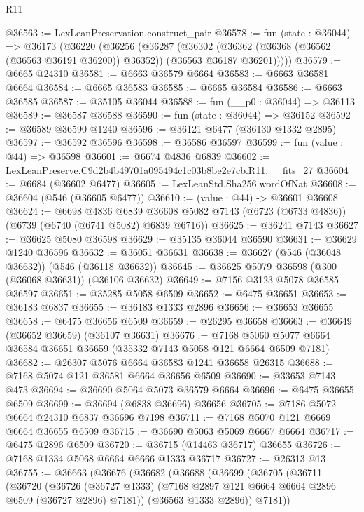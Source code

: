 \begin{lexlean}{R11}
\begin{coremodule}
@36563 := LexLeanPreservation.construct_pair
@36578 := fun (state : @36044) =>
  @36173
    (@36220
      (@36256
        (@36287
          (@36302
            (@36362 (@36368 (@36562 (@36563 @36191 @36200)) @36352))
            (@36563 @36187 @36201)))))
@36579 := @6665 @24310
@36581 := @6663 @36579 @6664
@36583 := @6663 @36581 @6664
@36584 := @6665 @36583
@36585 := @6665 @36584
@36586 := @6663 @36585
@36587 := @35105 @36044
@36588 := fun (__p0 : @36044) => @36113
@36589 := @36587 @36588
@36590 := fun (state : @36044) => @36152
@36592 := @36589 @36590 @1240
@36596 := @36121 @6477 (@36130 @1332 @2895)
@36597 := @36592 @36596
@36598 := @36586 @36597
@36599 := fun (value : @44) => @36598
@36601 := @6674 @4836 @6839
@36602 := LexLeanPreserve.C9d2b4b49701a095494c1c03b8be2e7cb.R11.__fits_27
@36604 := @6684 (@36602 @6477)
@36605 := LexLeanStd.Sha256.wordOfNat
@36608 := @36604 (@546 (@36605 @6477))
@36610 := (value : @44) -> @36601 @36608
@36624 := @6698
    @4836
    @6839
    @36608
    @5082
    @7143
    (@6723 (@6733 @4836))
    (@6739 (@6740 (@6741 @5082) @6839 @6716))
@36625 := @36241 @7143
@36627 := @36625 @5080 @36598
@36629 := @35135 @36044 @36590
@36631 := @36629 @1240 @36596
@36632 := @36051 @36631
@36638 := @36627 (@546 (@36048 @36632)) (@546 (@36118 @36632))
@36645 := @36625 @5079 @36598 (@300 (@36068 @36631)) (@36106 @36632)
@36649 := @7156 @3123 @5078 @36585 @36597
@36651 := @35285 @5058 @6509
@36652 := @6475 @36651
@36653 := @36183 @6837
@36655 := @36183 @1333 @2896
@36656 := @36653 @36655
@36658 := @6475 @36656 @6509
@36659 := @26295 @36658
@36663 := @36649 (@36652 @36659) (@36107 @36631)
@36676 := @7168 @5060 @5077 @6664 @36584 @36651 @36659 (@35332 @7143 @5058 @121 @6664 @6509 @7181)
@36682 := @26307 @5076 @6664 @36583 @1241 @36658 @26315
@36688 := @7168 @5074 @121 @36581 @6664 @36656 @6509
@36690 := @33653 @7143 @473
@36694 := @36690 @5064 @5073 @36579 @6664
@36696 := @6475 @36655 @6509
@36699 := @36694 (@6838 @36696) @36656
@36705 := @7186 @5072 @6664 @24310 @6837 @36696 @7198
@36711 := @7168 @5070 @121 @6669 @6664 @36655 @6509
@36715 := @36690 @5063 @5069 @6667 @6664
@36717 := @6475 @2896 @6509
@36720 := @36715 (@14463 @36717) @36655
@36726 := @7168 @1334 @5068 @6664 @6666 @1333 @36717
@36727 := @26313 @13
@36755 := @36663
    (@36676
      (@36682
        (@36688
          (@36699
            (@36705
              (@36711
                (@36720
                  (@36726
                    (@36727 @1333)
                    (@7168 @2897 @121 @6664 @6664 @2896 @6509 (@36727 @2896) @7181))
                  (@36563 @1333 @2896))
                @7181))

\end{coremodule}
\end{lexlean}
